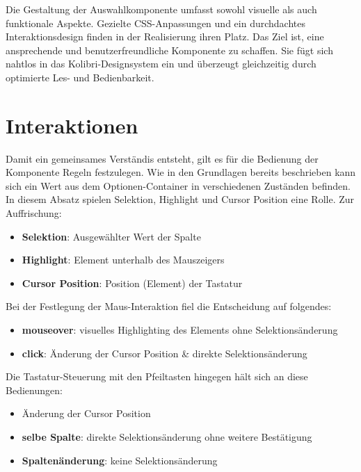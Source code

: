 Die Gestaltung der Auswahlkomponente umfasst sowohl visuelle als auch funktionale Aspekte. 
Gezielte CSS-Anpassungen und ein durchdachtes Interaktionsdesign finden in der Realisierung ihren Platz. 
Das Ziel ist, eine ansprechende und benutzerfreundliche Komponente zu schaffen. 
Sie fügt sich nahtlos in das Kolibri-Designsystem ein und überzeugt gleichzeitig durch optimierte Les- und Bedienbarkeit.


\section{Interaktionen}

Damit ein gemeinsames Verständis entsteht, gilt es für die Bedienung der Komponente Regeln festzulegen.
Wie in den Grundlagen bereits beschrieben kann sich ein Wert aus dem Optionen-Container in verschiedenen Zuständen befinden.
In diesem Absatz spielen Selektion, Highlight und Cursor Position eine Rolle.
Zur Auffrischung: 

\begin{itemize}
    \item \textbf{Selektion}: Ausgewählter Wert der Spalte
    \item \textbf{Highlight}: Element unterhalb des Mauszeigers
    \item \textbf{Cursor Position}: Position (Element) der Tastatur
\end{itemize}

\noindent
Bei der Festlegung der Maus-Interaktion fiel die Entscheidung auf folgendes:

\begin{itemize}
    \item \textbf{mouseover}: visuelles Highlighting des Elements ohne Selektionsänderung
    \item \textbf{click}: Änderung der Cursor Position \& direkte Selektionsänderung
\end{itemize}

\noindent
Die Tastatur-Steuerung mit den Pfeiltasten hingegen hält sich an diese Bedienungen:

\begin{itemize}
    \item Änderung der Cursor Position
    \item \textbf{selbe Spalte}: direkte Selektionsänderung ohne weitere Bestätigung
    \item \textbf{Spaltenänderung}: keine Selektionsänderung
\end{itemize}

